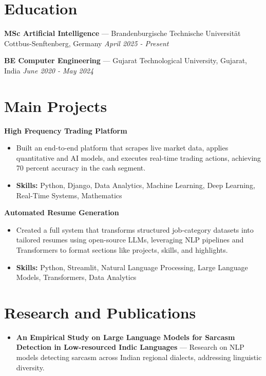 \documentclass[a4paper,10pt]{article}
\begin{document}
\section*{Education}
\textbf{MSc Artificial Intelligence} — Brandenburgische Technische Universität Cottbus-Senftenberg, Germany \hfill \textit{April 2025 - Present}\par
\vspace{1.5pt}
\textbf{BE Computer Engineering} — Gujarat Technological University, Gujarat, India \hfill \textit{June 2020 - May 2024}\par

\section*{Main Projects}
\textbf{High Frequency Trading Platform}\par
\vspace{1pt}
\begin{itemize}
  \item Built an end-to-end platform that scrapes live market data, applies quantitative and AI models, and executes real-time trading actions, achieving 70 percent accuracy in the cash segment.
  \item \textbf{Skills:} Python, Django, Data Analytics, Machine Learning, Deep Learning, Real-Time Systems, Mathematics
\end{itemize}
\vspace{3pt}
\textbf{Automated Resume Generation}\par
\vspace{1pt}
\begin{itemize}
  \item Created a full system that transforms structured job-category datasets into tailored resumes using open-source LLMs, leveraging NLP pipelines and Transformers to format sections like projects, skills, and highlights.
  \item \textbf{Skills:} Python, Streamlit, Natural Language Processing, Large Language Models, Transformers, Data Analytics
\end{itemize}

\section*{Research and Publications}
\begin{itemize}
\item \textbf{An Empirical Study on Large Language Models for Sarcasm Detection in Low-resourced Indic Languages} — Research on NLP models detecting sarcasm across Indian regional dialects, addressing linguistic diversity.
\end{itemize}
\end{document}
